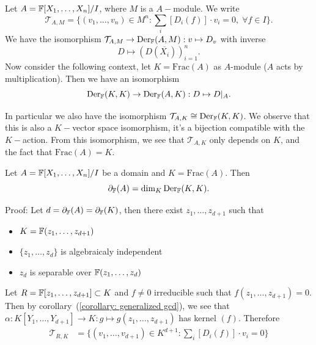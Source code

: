 \begin{itemize}
  \begin{notation}
    Let $A=\mathbb{F}[X_1,\dots,X_n]/I$, where $M$ is a $A-$module. We write 
    \begin{equation}
        \mathcal{T}_{A,M}=\{(v_1,\dots,v_n)\in M^n:\sum_i[D_i(f)]\cdot v_i=0,\;\forall f\in I\}.
    \end{equation}
    We have the isomorphism $\mathcal{T}_{A,M}\to \text{Der}_{\mathbb{F}}(A,M): v\mapsto D_v$ with inverse 
    \begin{equation}
        D\mapsto (D(\overline{X_i}))_{i=1}^n.
    \end{equation}
    Now consider the following context, let 
    $K=\text{Frac}(A)$ as $A$-module ($A$ acts by multiplication). Then we have an isomorphism
    \begin{equation}
        \text{Der}_{\mathbb{F}}(K,K)\to \text{Der}_{\mathbb{F}}(A,K):D\mapsto D|_A.
    \end{equation}
  \end{notation}
  In particular we also have the isomorphism $\mathcal{T}_{A,K} \cong  \text{Der}_{\mathbb{F}}(K,K)$. We observe that 
  this is also a $K-$vector space isomorphism, it's a bijection compatible with the $K-$action. From this isomorphism, 
  we see that $\mathcal{T}_{A,K}$ only depends on $K$, and the fact that $\text{Frac}(A)=K$.
  \begin{theorem}
    Let $A=\mathbb{F}[X_1,\dots,X_n]/I$ be a domain and $K=\text{Frac}(A)$. Then 
    \begin{equation}
        \partial_{\mathbb{F}}(A) = \dim_{K}\text{Der}_{\mathbb{F}}(K,K).
    \end{equation} 
  \end{theorem}
  Proof: Let $d=\partial_{\mathbb{F}}(A)=\partial_{\mathbb{F}}(K)$, then there exist 
  $z_1,\dots, z_{d+1}$ such that 
  \begin{itemize}
    \item $K=\mathbb{F}(z_1,\dots, z_{d+1})$
    \item $\{z_1,\dots,z_d\}$ is algebraicaly independent
    \item $z_d$ is separable over $\mathbb{F}(z_1,\dots, z_d)$
  \end{itemize}
  Let $R = \mathbb{F}[z_1,\dots, z_{d+1}]\subset K$ and $f\neq0$ irreducible such that 
  $f(z_1,\dots, z_{d+1})=0$. Then by corollary~(\ref{corollary: generalized gcd}), we see that 
  $\alpha:K[Y_1,\dots,Y_{d+1}]\to K:g\mapsto g(z_1,\dots, z_{d+1})$ has kernel $(f)$. 
  Therefore 
  \begin{equation}
    \begin{split}
        \mathcal{T}_{R,K} &= \{(v_1,\dots,v_{d+1})\in K^{d+1}:\sum_i[D_i(f)]\cdot v_i=0\}\\

\end{split}
\end{equation}
\end{itemize}
